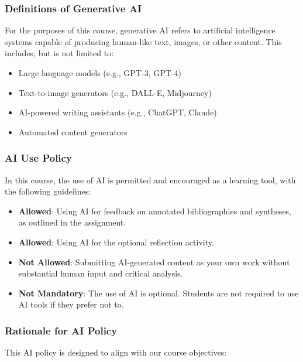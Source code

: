 \documentclass[11pt, letterpaper]{article}
\begin{document}
\subsubsection*{Definitions of Generative AI}

\noindent For the purposes of this course, generative AI refers to artificial intelligence systems capable of producing human-like text, images, or other content. This includes, but is not limited to:

\begin{itemize}
    \item Large language models (e.g., GPT-3, GPT-4)
    \item Text-to-image generators (e.g., DALL-E, Midjourney)
    \item AI-powered writing assistants (e.g., ChatGPT, Claude)
    \item Automated content generators
\end{itemize}

\subsubsection*{AI Use Policy}

In this course, the use of AI is permitted and encouraged as a learning tool, with the following guidelines:

\begin{itemize}
    \item \textbf{Allowed}: Using AI for feedback on annotated bibliographies and syntheses, as outlined in the assignment.
    \item \textbf{Allowed}: Using AI for the optional reflection activity.
    \item \textbf{Not Allowed}: Submitting AI-generated content as your own work without substantial human input and critical analysis.
    \item \textbf{Not Mandatory}: The use of AI is optional. Students are not required to use AI tools if they prefer not to.
\end{itemize}

\subsubsection*{Rationale for AI Policy}

This AI policy is designed to align with our course objectives:
\end{document}
